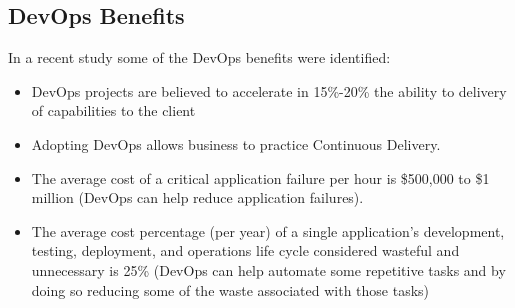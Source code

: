         \subsection{DevOps Benefits}
        In a recent study \cite{Elliot2015} some of the DevOps benefits were identified:
  		  \begin{itemize}
  			    \item DevOps projects are believed to accelerate in 15\%-20\% the ability to delivery of capabilities to the client
            \item Adopting DevOps allows business to practice Continuous Delivery.
            \item The average cost of a critical application failure per hour is \$500,000 to \$1 million (DevOps can help reduce application failures).
            \item The average cost percentage (per year) of a single application's development, testing, deployment, and operations life cycle considered wasteful and unnecessary is 25\% (DevOps can help automate some repetitive tasks and by doing so reducing some of the waste associated with those tasks)
  		  \end{itemize}

